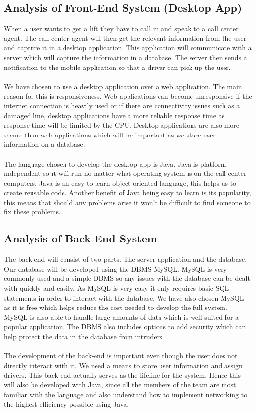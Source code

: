 \documentclass[a4paper,12pt]{article}
\begin{document}
\subsection{Analysis of Front-End System (Desktop App)}
When a user wants to get a lift they have to call in and speak to a call center agent. The call center agent will then get the relevant information from the user and capture it in a desktop application. This application will communicate with a server which will capture the information in a database. The server then sends a notification to the mobile application so that a driver can pick up the user.\\\\
We have chosen to use a desktop application over a web application. The main reason for this is responsiveness. Web applications can become unresponsive if the internet connection is heavily used or if there are connectivity issues such as a damaged line, desktop applications have a more reliable response time as response time will be limited by the CPU. Desktop applications are also more secure than web applications which will be important as we store user information on a database.\\\\
The language chosen to develop the desktop app is Java. Java is platform independent so it will run no matter what operating system is on the call center computers. Java is an easy to learn object oriented language, this helps us to create reusable code. Another benefit of Java being easy to learn is its popularity, this means that should any problems arise it won't be difficult to find someone to fix these problems.
\newpage
\subsection{Analysis of Back-End System}
The back-end will consist of two parts. The server application and the database.
Our database will be developed using the DBMS MySQL. MySQL is very commonly used and a simple DBMS so any issues with the database can be dealt with quickly and easily. As MySQL is very easy it only requires basic SQL statements in order to interact with the database. We have also chosen MySQL as it is free which helps reduce the cost needed to develop the full system. MySQL is also able to handle large amounts of data which is well suited for a popular application. The DBMS also includes options to add security which can help protect the data in the database from intruders.
\\\\
The development of the back-end is important even though the user does not directly interact with it. We need a means to store user information and assign drivers. This back-end actually serves as the lifeline for the system. Hence this will also be developed with Java, since all the members of the team are most familiar with the language and also understand how to implement networking to the highest efficiency possible using Java.
\end{document}
